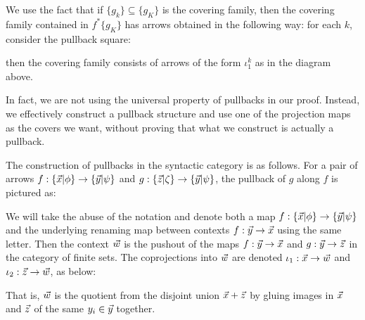 We use the fact that if $\{g_k\}\subseteq \{g_K\}$ is the covering family, then the covering family contained in $f^*\{g_K\}$ has arrows obtained in the following
way: for each $k$, consider the pullback square:
\begin{center}
\end{center}

then the covering family consists of arrows of the form $\iota_1^k$ as in the diagram above.

In fact, we are not using the universal property of pullbacks in our proof. Instead, we effectively construct a pullback structure and use
one of the projection maps as the covers we want, without proving that what we construct is actually a pullback.

The construction of pullbacks in the syntactic category is as follows. For a pair of arrows $f: \{ \vec{x} | \phi \}\to \{ \vec{y} | \psi \}$ and $g:\{ \vec{z} | \zeta \}\to \{ \vec{y} | \psi \}$,
the pullback of $g$ along $f$ is pictured as:


\begin{center}
\end{center}
We will take the abuse of the notation and denote both a map $f:\{ \vec{x} | \phi \}\to \{ \vec{y} | \psi \}$ and the underlying renaming map between contexts $f:\vec{y}\to \vec{x}$
using the same letter.
Then the context $\vec{w}$ is the pushout of the maps $f:\vec{y}\to \vec{x}$ and $g:\vec{y}\to \vec{z}$ in the category of finite sets.
The coprojections into $\vec{w}$ are denoted $\iota_1:\vec{x}\to\vec{w}$ and $\iota_2:\vec{z}\to \vec{w}$, as below:

\begin{center}
\end{center}

That is, $\vec{w}$ is the quotient from the disjoint union $\vec{x} + \vec{z}$ by gluing images in $\vec{x}$ and $\vec{z}$ of the same $y_i\in \vec{y}$ together.


